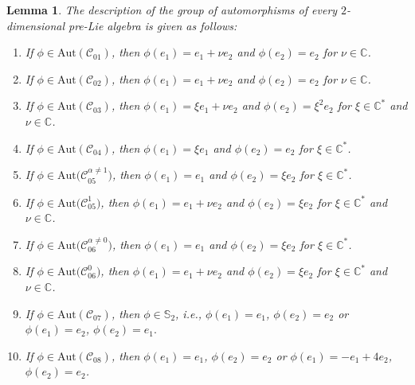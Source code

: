 \documentclass[pdftex]{sigma}
\numberwithin{equation}{section}
\newtheorem{Lemma}[Theorem]{Lemma}
\begin{document}
\begin{Lemma}
\label{pre-Lie aut} The description of the group of automorphisms of every $2
$-dimensional pre-Lie algebra is given as follows:
\begin{enumerate}\itemsep=0pt
\item[$(1)$] If $\phi \in \mathrm{Aut}(\mathcal{C}_{01})$, then $\phi
(e_{1})=e_{1}+\nu e_{2}$ and $\phi (e_{2})=e_{2}$ for $\nu \in \mathbb{C}$.

\item[$(2)$] If $\phi \in \mathrm{Aut}(\mathcal{C}_{02})$, then $\phi
(e_{1})=e_{1}+\nu e_{2}$ and $\phi (e_{2})=e_{2}$ for $\nu \in \mathbb{C}$.

\item[$(3)$] If $\phi \in \mathrm{Aut}(\mathcal{C}_{03})$, then $\phi (e_{1})=\xi
e_{1}+\nu e_{2}$ and $\phi (e_{2})=\xi ^{2}e_{2}$ for $\xi \in \mathbb{C}%
^{\ast }$ and $\nu \in \mathbb{C}$.

\item[$(4)$] If $\phi \in \mathrm{Aut}(\mathcal{C}_{04})$, then $\phi (e_{1})=\xi
e_{1}$ and $\phi (e_{2})=e_{2}$ for $\xi \in \mathbb{C}^{\ast }$.

\item[$(5)$] If $\phi \in \mathrm{Aut}\bigl(\mathcal{C}_{05}^{\alpha \neq 1}\bigr)$, then $%
\phi (e_{1})=e_{1}$ and $\phi (e_{2})=\xi e_{2}$ for $\xi \in \mathbb{C}%
^{\ast }$.

\item[$(6)$] If $\phi \in \mathrm{Aut}\bigl(\mathcal{C}_{05}^{1}\bigr)$, then $\phi
(e_{1})=e_{1}+\nu e_{2}$ and $\phi (e_{2})=\xi e_{2}$ for $\xi \in \mathbb{C%
}^{\ast }$ and $\nu \in \mathbb{C}$.

\item[$(7)$] If $\phi \in \mathrm{Aut}\bigl(\mathcal{C}_{06}^{\alpha \neq 0}\bigr)$, then $%
\phi (e_{1})=e_{1}$ and $\phi (e_{2})=\xi e_{2}$ for $\xi \in \mathbb{C}%
^{\ast }$.

\item[$(8)$] If $\phi \in \mathrm{Aut}\bigl(\mathcal{C}_{06}^{0}\bigr)$, then $\phi
(e_{1})=e_{1}+\nu e_{2}$ and $\phi (e_{2})=\xi e_{2}$ for $\xi \in \mathbb{C%
}^{\ast }$ and $\nu \in \mathbb{C}$.

\item[$(9)$] If $\phi \in \mathrm{Aut}(\mathcal{C}_{07})$, then $\phi \in \mathbb{S}%
_{2}$, i.e., $\phi (e_{1})=e_{1}$, $ \phi (e_{2})=e_{2}$ or $\phi
(e_{1})=e_{2}$, $ \phi (e_{2})=e_{1}.$

\item[$(10)$] If $\phi \in \mathrm{Aut}(\mathcal{C}_{08})$, then $\phi
(e_{1})=e_{1}$, $\phi (e_{2})=e_{2}$ or $\phi (e_{1})=-e_{1}+4e_{2}$, $\phi
(e_{2})=e_{2}$.
\end{enumerate}
\end{Lemma}
\end{document}
